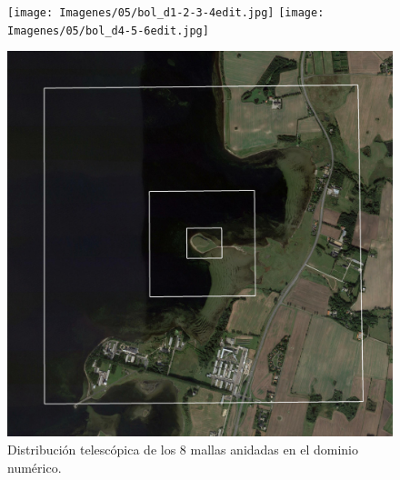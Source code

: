 \begin{figure}[H]
	\centering
	\texttt{[image: Imagenes/05/bol\_d1-2-3-4edit.jpg]}
	\texttt{[image: Imagenes/05/bol\_d4-5-6edit.jpg]}
	
	\bigskip
	\includegraphics[width=0.6\linewidth,page=1,trim={5mm 3mm 3mm 3mm},clip,frame]{Imagenes/05/bol_d6-7-8edit.jpg}%
	
	\caption{Distribución telescópica de los 8 mallas anidadas en el dominio numérico.}
	\label{fig:c3dom_telesco}
\end{figure}

